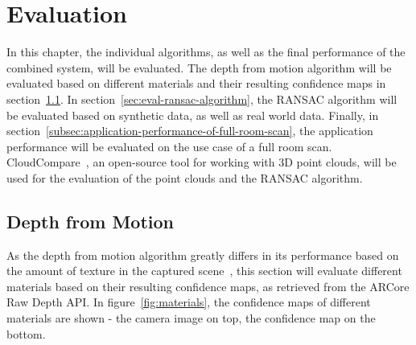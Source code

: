 \chapter{Evaluation}\label{ch:evaluation}
In this chapter, the individual algorithms, as well as the final performance of the combined system, will be evaluated.
The depth from motion algorithm will be evaluated based on different materials and their resulting confidence maps in section~\ref{sec:eval-depth-from-motion}.
In section~\ref{sec:eval-ransac-algorithm}, the RANSAC algorithm will be evaluated based on synthetic data, as well as real world data.
Finally, in section~\ref{subsec:application-performance-of-full-room-scan}, the application performance will be evaluated on the use case of a full room scan.
CloudCompare~\cite{daniel_girardeau-montaut_cloudcompare_nodate}, an open-source tool for working with 3D point clouds, will be used for the evaluation of the point clouds and the RANSAC algorithm.

\section{Depth from Motion}\label{sec:eval-depth-from-motion}
As the depth from motion algorithm greatly differs in its performance based on the amount of texture in the captured scene~\cite{google_llc_arcore_doc},
this section will evaluate different materials based on their resulting confidence maps, as retrieved from the ARCore Raw Depth API\@.
In figure~\ref{fig:materials}, the confidence maps of different materials are shown - the camera image on top, the confidence map on the bottom.

